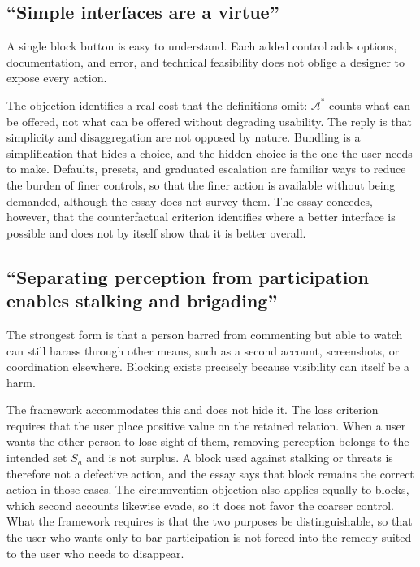 \subsection{``Simple interfaces are a virtue''}

A single block button is easy to understand. Each added control adds options, documentation, and error, and technical feasibility does not oblige a designer to expose every action.

The objection identifies a real cost that the definitions omit: $\mathcal{A}^{*}$ counts what can be offered, not what can be offered without degrading usability. The reply is that simplicity and disaggregation are not opposed by nature. Bundling is a simplification that hides a choice, and the hidden choice is the one the user needs to make. Defaults, presets, and graduated escalation are familiar ways to reduce the burden of finer controls, so that the finer action is available without being demanded, although the essay does not survey them. The essay concedes, however, that the counterfactual criterion identifies where a better interface is possible and does not by itself show that it is better overall.

\subsection{``Separating perception from participation enables stalking and brigading''}

The strongest form is that a person barred from commenting but able to watch can still harass through other means, such as a second account, screenshots, or coordination elsewhere. Blocking exists precisely because visibility can itself be a harm.

The framework accommodates this and does not hide it. The loss criterion requires that the user place positive value on the retained relation. When a user wants the other person to lose sight of them, removing perception belongs to the intended set $S_a$ and is not surplus. A block used against stalking or threats is therefore not a defective action, and the essay says that block remains the correct action in those cases. The circumvention objection also applies equally to blocks, which second accounts likewise evade, so it does not favor the coarser control. What the framework requires is that the two purposes be distinguishable, so that the user who wants only to bar participation is not forced into the remedy suited to the user who needs to disappear.

